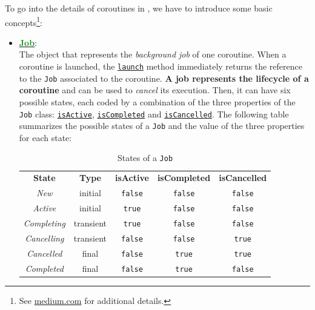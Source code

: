 To go into the details of coroutines in \Kotlin, we have to introduce some basic concepts\footnote{See \href{https://medium.com/mobile-app-development-publication/kotlin-coroutine-scope-context-and-job-made-simple-5adf89fcfe94}{medium.com} for additional details.}:
\begin{itemize}
	\item \href{https://kotlinlang.org/api/kotlinx.coroutines/kotlinx-coroutines-core/kotlinx.coroutines/-job/}{\underline{\textbf{\textcolor{ForestGreen}{Job}}}}:\\
	The object that represents the \textit{background job} of one coroutine. When a coroutine is launched, the \href{https://kotlinlang.org/api/kotlinx.coroutines/kotlinx-coroutines-core/kotlinx.coroutines/launch.html}{\texttt{launch}} method immediately returns the reference to the \texttt{Job} associated to the coroutine. \textbf{A job represents the lifecycle of a coroutine} and can be used to \textit{cancel} its execution. Then, it can have six possible states, each coded by a combination of the three properties of the \texttt{Job} class: \href{https://kotlinlang.org/api/kotlinx.coroutines/kotlinx-coroutines-core/kotlinx.coroutines/-job/is-active.html}{\texttt{isActive}}, \href{https://kotlinlang.org/api/kotlinx.coroutines/kotlinx-coroutines-core/kotlinx.coroutines/-job/is-completed.html}{\texttt{isCompleted}} and \href{https://kotlinlang.org/api/kotlinx.coroutines/kotlinx-coroutines-core/kotlinx.coroutines/-job/is-cancelled.html}{\texttt{isCancelled}}.
	The following table summarizes the possible states of a \texttt{Job} and the value of the three properties for each state:
	\begin{table}[h!]
		\centering
		\begin{tabular}{ccccc}
			\textbf{State} & \textbf{Type} & \textbf{isActive} & \textbf{isCompleted} & \textbf{isCancelled} \\
			\textit{New}        & initial   & \texttt{false} & \texttt{false} & \texttt{false} \\
			\textit{Active}     & initial   & \texttt{true}  & \texttt{false} & \texttt{false} \\
			\textit{Completing} & transient & \texttt{true}  & \texttt{false} & \texttt{false} \\
			\textit{Cancelling} & transient & \texttt{false} & \texttt{false} & \texttt{true}  \\
			\textit{Cancelled}  & final     & \texttt{false} & \texttt{true}  & \texttt{true}  \\
			\textit{Completed}  & final     & \texttt{false} & \texttt{true}  & \texttt{false}
		\end{tabular}
		\caption{States of a \texttt{Job}}
		\label{tab:job_states}
	\end{table}


\end{itemize}

